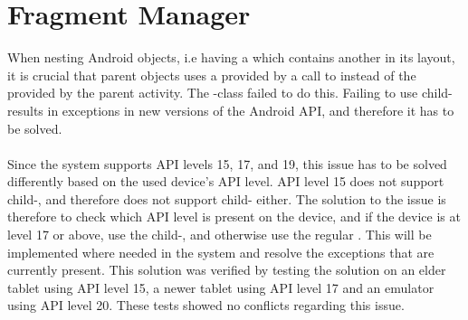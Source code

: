 \section{Fragment Manager}
\label{sec:fragment_manager}

When nesting Android  objects, i.e having a  which contains another  in its layout, it is crucial that parent  objects uses a  provided by a call to  instead of the  provided by the parent activity. The \giraf-class  failed to do this. Failing to use child- results in exceptions in new versions of the Android API, and therefore it has to be solved. 
\\\\

Since the \giraf system supports API levels 15, 17, and 19, this issue has to be solved differently based on the used device's API level. API level 15 does not support child-, and therefore does not support child- either. The solution to the issue is therefore to check which API level is present on the device, and if the device is at level 17 or above, use the child-, and otherwise use the regular . This will be implemented where needed in the \giraf system and resolve the exceptions that are currently present. This solution was verified by testing the solution on an elder tablet using API level 15, a newer tablet using API level 17 and an emulator using API level 20. These tests showed no conflicts regarding this issue.
